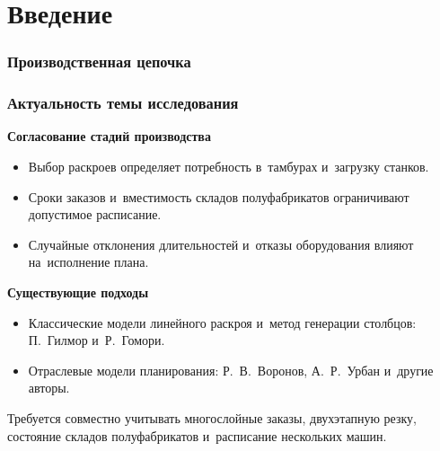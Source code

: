 \section{Введение}

\begin{frame}[fragile]
    \frametitle{Производственная цепочка}
    \centering
    \begin{figure}
        \resizebox{\textwidth}{!}{
            
        }
    \end{figure}

    \vspace{0.1cm}
    
\end{frame}

\begin{frame}
    \frametitle{Актуальность темы исследования}
    \textbf{Согласование стадий производства}
    \begin{itemize}
        \item Выбор раскроев определяет потребность в~тамбурах и~загрузку станков.
        \item Сроки заказов и~вместимость складов полуфабрикатов ограничивают допустимое расписание.
        \item Случайные отклонения длительностей и~отказы оборудования влияют на~исполнение плана.
    \end{itemize}
    \vspace{0.2cm}
    \textbf{Существующие подходы}
    \begin{itemize}
        \item Классические модели линейного раскроя и~метод генерации столбцов: П.~Гилмор и~Р.~Гомори.
        \item Отраслевые модели планирования: Р.~В.~Воронов, А.~Р.~Урбан и~другие авторы.
    \end{itemize}
    \vspace{0.2cm}
    Требуется совместно учитывать многослойные заказы, двухэтапную резку, состояние складов полуфабрикатов и~расписание нескольких машин.
\end{frame}

